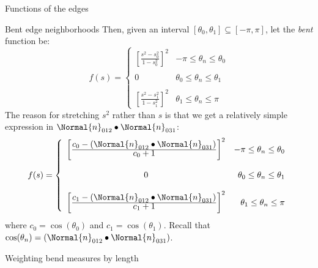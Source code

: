 \begin{plSection}{Functions of the edges}
\begin{plSection}{Bent edge neighborhoods}
Then, 
given an interval 
$\left[ \theta_0, \theta_1 \right] 
\subseteq 
\left[ -\pi, \pi \right]$,
let the {\it bent} function be:
\begin{equation}
f(s)
= 
\left\{
\begin{array}{cr}
\left[ {  
\frac{\textstyle
s^2 - s_0^2}
{\textstyle
1 - s_0^2}
  } \right]^2 
& -\pi \leq \theta_n \leq \theta_0
\\
\\
0                            
& \theta_0 \leq \theta_n \leq \theta_1
\\
\\
\left[
\frac{\textstyle s^2 - s_1^2}{\textstyle 1 - s_1^2}
\right]^2  
& \theta_1 \leq \theta_n \leq \pi
\end{array}
\right.
\end{equation}
The reason for stretching $s^2$ rather than $s$
is that we get a relatively simple expression
in $\Normal{n}_{012} \bullet \Normal{n}_{031}$:
\begin{equation}
f(s)
= 
\left\{
\begin{array}{cr}
\left[
\frac{\textstyle c_0 - \left(\Normal{n}_{012} \bullet \Normal{n}_{031}\right) } 
{\textstyle c_0 + 1}
\right]^2
& -\pi \leq \theta_n \leq \theta_0
\\
\\
0                            
& \theta_0 \leq \theta_n \leq \theta_1
\\
\\
\left[ 
\frac{
\textstyle{
c_1 - \left(\Normal{n}_{012} \bullet \Normal{n}_{031}\right)
}
} 
{\textstyle{ c_1 + 1}} 
\right]^2
& \theta_1 \leq \theta_n \leq \pi
\end{array}
\right.
\end{equation}
where $c_0 = \cos(\theta_0)$
and $c_1 = \cos(\theta_1)$.
Recall that 
$\cos(\theta_n) = 
\left(\Normal{n}_{012} \bullet \Normal{n}_{031}\right)$.

\end{plSection}%

\begin{plSection}{Weighting bend measures by length}
\label{sec:length_weighted_bend}


\end{plSection}
\end{plSection}
